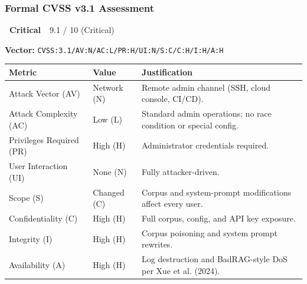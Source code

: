 \documentclass[11pt,a4paper]{report}
\newcommand{\badgecritical}{\colorbox{danger}{\color{white}\small\textbf{~Critical~}}}
\newcommand{\cvssvec}[1]{\texttt{\small #1}}
\begin{document}
\subsubsection{Formal CVSS v3.1 Assessment}

\begin{cvssbox}{\badgecritical\ 9.1 / 10 (Critical)}
\vspace{2pt}
\begin{center}
\textbf{Vector:}\enspace
\cvssvec{CVSS:3.1/AV:N/AC:L/PR:H/UI:N/S:C/C:H/I:H/A:H}
\end{center}
\vspace{8pt}
\begin{tabular}{W{3.4cm}W{2.2cm}W{7.8cm}}
\toprule
  
  \small\textbf{Metric} &
  \small\textbf{Value} &
  \small\textbf{Justification} \\
  \midrule
  
  \small Attack Vector (AV)     & \small Network (N) & \small Remote admin channel (SSH, cloud console, CI/CD). \\
  
  \small Attack Complexity (AC) & \small Low (L)     & \small Standard admin operations; no race condition or special config. \\
  
  \small Privileges Required (PR)  & \small High (H) & \small Administrator credentials required. \\
  
  \small User Interaction (UI)  & \small None (N)    & \small Fully attacker-driven. \\
  
  \small Scope (S)              & \small Changed (C) & \small Corpus and system-prompt modifications affect every user. \\
  
  \small Confidentiality (C)    & \small High (H)    & \small Full corpus, config, and API key exposure. \\
  
  \small Integrity (I)          & \small High (H)    & \small Corpus poisoning and system prompt rewrites. \\
  
  \small Availability (A)       & \small High (H)    & \small Log destruction and BadRAG-style DoS per Xue et al. (2024). \\
  \bottomrule
\end{tabular}
\vspace{6pt}


\end{cvssbox}
\end{document}
